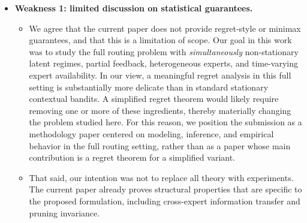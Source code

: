 \begin{itemize}
    \item \textbf{Weakness 1: limited discussion on statistical guarantees.}
    \begin{itemize}
        \item We agree that the current paper does not provide regret-style or minimax guarantees, and that this is a limitation of scope. Our goal in this work was to study the full routing problem with \emph{simultaneously} non-stationary latent regimes, partial feedback, heterogeneous experts, and time-varying expert availability. In our view, a meaningful regret analysis in this full setting is substantially more delicate than in standard stationary contextual bandits. A simplified regret theorem would likely require removing one or more of these ingredients, thereby materially changing the problem studied here. For this reason, we position the submission as a methodology paper centered on modeling, inference, and empirical behavior in the full routing setting, rather than as a paper whose main contribution is a regret theorem for a simplified variant.
        \item That said, our intention was not to replace all theory with experiments. The current paper already proves structural properties that are specific to the proposed formulation, including cross-expert information transfer and pruning invariance.
    \end{itemize}


\end{itemize}
